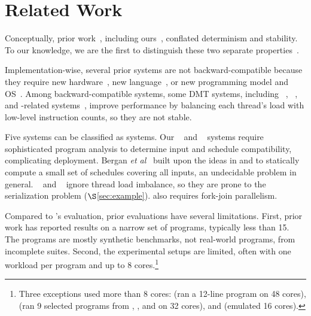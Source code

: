 \vspace{-.02in}
\section{Related Work} \label{sec:related}
\vspace{-.02in}

  Conceptually, prior
work~\cite{dthreads:sosp11, cui:tern:osdi10, peregrine:sosp11,
  determinator:osdi10}, including ours~\cite{cui:tern:osdi10,
  peregrine:sosp11}, conflated determinism and stability.  To our
knowledge, we are the first to distinguish these two separate
properties~\cite{smt:cacm,smt:hotpar13}.

Implementation-wise, several prior systems are not backward-compatible
because they require new hardware~\cite{dmp:asplos09}, new
language~\cite{dpj:oopsla09}, or new programming model and
OS~\cite{determinator:osdi10}.  Among backward-compatible systems, some
DMT systems, including \kendo~\cite{kendo:asplos09},
\coredet~\cite{coredet:asplos10}, and \coredet-related
systems~\cite{dos:osdi10, ddos:asplos13}, improve performance by balancing
each thread's load with low-level instruction counts, so they are not
stable.

Five systems can be classified as \smt systems.  Our
\tern~\cite{cui:tern:osdi10} and \peregrine~\cite{peregrine:sosp11} systems
require sophisticated program analysis to determine input and schedule
compatibility, complicating deployment. Bergan {\it et
  al}~\cite{bergan:oopsla13} built upon the ideas in \tern and \peregrine
to statically compute a small set of schedules covering all inputs, an
undecidable problem in general.  \grace~\cite{grace:oopsla09} and \dthreads~\cite{dthreads:sosp11} ignore thread load
imbalance, so they are prone to the serialization problem
($\S$\ref{sec:example}). \grace also requires
fork-join parallelism.

Compared to \xxx's evaluation, prior evaluations have several limitations.
First, prior work has reported results on a narrow set of programs,
typically less than 15.  The programs are mostly synthetic benchmarks, not
real-world programs, from incomplete suites.  Second, the experimental
setups are limited, often with one workload per program and up to 8
cores.\footnote{Three exceptions used more than 8 cores:
  \cite{kendo:wodet11} (ran a 12-line program on 48 cores),
  \cite{aviram:thesis} (ran 9 selected programs from \parsec, \splashx, and
  \npb on 32 cores), and \cite{dmp:asplos09} (emulated 16 cores).}


